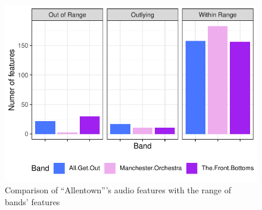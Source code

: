 \documentclass{article}\usepackage[]{graphicx}\usepackage[]{xcolor}
\makeatletter
\def\maxwidth{ %
  \ifdim\Gin@nat@width>\linewidth
    \linewidth
  \else
    \Gin@nat@width
  \fi
}
\newenvironment{knitrout}{}{} %
\makeatother
\begin{document}
\begin{figure}[H] \begin{center}
\begin{knitrout}
\color{fgcolor}
\includegraphics[width=\maxwidth]{figure/unnamed-chunk-6-1} 
\end{knitrout}
\caption{Comparison of ``Allentown'''s audio features with the range of bands' features} \label{plot.allen}
\end{center}
\end{figure}
\end{document}
